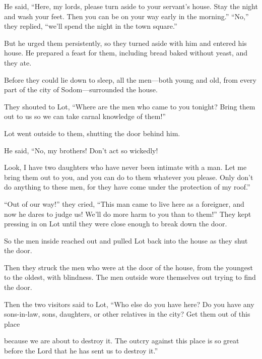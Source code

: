 \begin{scripture}
 He said, ``Here, my lords, please turn aside to your servant's house. Stay the night and wash your feet. Then you can be on your way early in the morning.'' ``No,'' they replied, ``we'll spend the night in the town square.''
\everypar{}

 But he urged them persistently, so they turned aside with him and entered his house. He prepared a feast for them, including bread baked without yeast, and they ate.
 Before they could lie down to sleep, all the men---both young and old, from every part of the city of Sodom---surrounded the house.
 They shouted to Lot, ``Where are the men who came to you tonight? Bring them out to us so we can take carnal knowledge of them!''
\everypar{}

 Lot went outside to them, shutting the door behind him.
 He said, ``No, my brothers! Don't act so wickedly!
 Look, I have two daughters who have never been intimate with a man. Let me bring them out to you, and you can do to them whatever you please. Only don't do anything to these men, for they have come under the protection of my roof.''
\everypar{}

 ``Out of our way!'' they cried, ``This man came to live here as a foreigner, and now he dares to judge us! We'll do more harm to you than to them!'' They kept pressing in on Lot until they were close enough to break down the door.
\everypar{}

 So the men inside reached out and pulled Lot back into the house as they shut the door.
 Then they struck the men who were at the door of the house, from the youngest to the oldest, with blindness. The men outside wore themselves out trying to find the door.
 Then the two visitors said to Lot, ``Who else do you have here? Do you have any sons-in-law, sons, daughters, or other relatives in the city? Get them out of this place
 because we are about to destroy it. The outcry against this place is so great before the Lord that he has sent us to destroy it.''
\everypar{}


\end{scripture}
